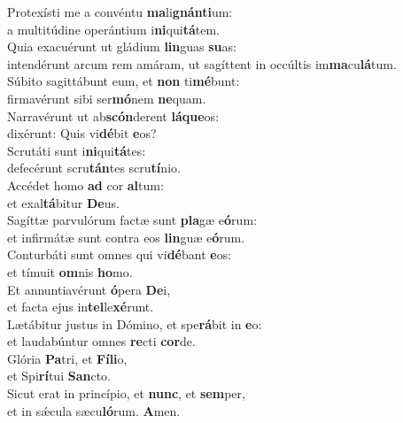 \evenverse Protexísti me a convéntu \textbf{ma}li\textbf{gnán}\textbf{ti}um:~\*\\
\evenverse a multitúdine operántium i\textbf{ni}qui\textbf{tá}tem.\\
\oddverse Quia exacuérunt ut gládium \textbf{lin}guas \textbf{su}as:~\*\\
\oddverse intendérunt arcum rem amáram, ut sagíttent in occúltis im\textbf{ma}cu\textbf{lá}tum.\\
\evenverse Súbito sagittábunt eum, et \textbf{non} ti\textbf{mé}bunt:~\*\\
\evenverse firmavérunt sibi ser\textbf{mó}nem \textbf{ne}quam.\\
\oddverse Narravérunt ut ab\textbf{scón}derent \textbf{lá}\textbf{que}os:~\*\\
\oddverse dixérunt: Quis vi\textbf{dé}bit \textbf{e}os?\\
\evenverse Scrutáti sunt i\textbf{ni}qui\textbf{tá}tes:~\*\\
\evenverse defecérunt scru\textbf{tán}tes scru\textbf{tí}nio.\\
\oddverse Accédet homo \textbf{ad} cor \textbf{al}tum:~\*\\
\oddverse et exal\textbf{tá}bitur \textbf{De}us.\\
\evenverse Sagíttæ parvulórum factæ sunt \textbf{pla}gæ e\textbf{ó}rum:~\*\\
\evenverse et infirmátæ sunt contra eos \textbf{lin}guæ e\textbf{ó}rum.\\
\oddverse Conturbáti sunt omnes qui vi\textbf{dé}bant \textbf{e}os:~\*\\
\oddverse et tímuit \textbf{om}nis \textbf{ho}mo.\\
\evenverse Et annuntiavérunt \textbf{ó}pera \textbf{De}i,~\*\\
\evenverse et facta ejus in\textbf{tel}le\textbf{xé}runt.\\
\oddverse Lætábitur justus in Dómino, et spe\textbf{rá}bit in \textbf{e}o:~\*\\
\oddverse et laudabúntur omnes \textbf{re}cti \textbf{cor}de.\\
\evenverse Glória \textbf{Pa}tri, et \textbf{Fí}\textbf{li}o,~\*\\
\evenverse et Spi\textbf{rí}tui \textbf{San}cto.\\
\oddverse Sicut erat in princípio, et \textbf{nunc}, et \textbf{sem}per,~\*\\
\oddverse et in sǽcula sæcu\textbf{ló}rum. \textbf{A}men.\\
